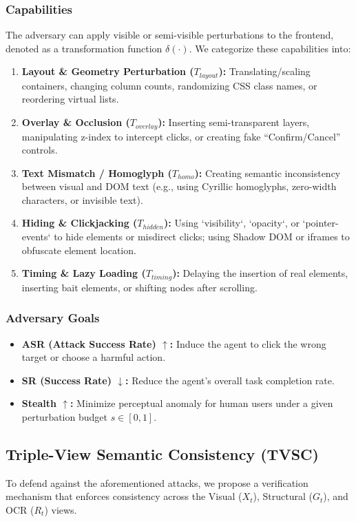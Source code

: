 \documentclass[runningheads]{llncs}
\begin{document}
\subsubsection{Capabilities}
The adversary can apply visible or semi-visible perturbations to the frontend, denoted as a transformation function $\delta(\cdot)$. We categorize these capabilities into:
\begin{enumerate}
    \item \textbf{Layout \& Geometry Perturbation ($T_{layout}$):} Translating/scaling containers, changing column counts, randomizing CSS class names, or reordering virtual lists.
    \item \textbf{Overlay \& Occlusion ($T_{overlay}$):} Inserting semi-transparent layers, manipulating z-index to intercept clicks, or creating fake ``Confirm/Cancel'' controls.
    \item \textbf{Text Mismatch / Homoglyph ($T_{homo}$):} Creating semantic inconsistency between visual and DOM text (e.g., using Cyrillic homoglyphs, zero-width characters, or invisible text).
    \item \textbf{Hiding \& Clickjacking ($T_{hidden}$):} Using `visibility`, `opacity`, or `pointer-events` to hide elements or misdirect clicks; using Shadow DOM or iframes to obfuscate element location.
    \item \textbf{Timing \& Lazy Loading ($T_{timing}$):} Delaying the insertion of real elements, inserting bait elements, or shifting nodes after scrolling.
\end{enumerate}

\subsubsection{Adversary Goals}
\begin{itemize}
    \item \textbf{ASR (Attack Success Rate) $\uparrow$:} Induce the agent to click the wrong target or choose a harmful action.
    \item \textbf{SR (Success Rate) $\downarrow$:} Reduce the agent's overall task completion rate.
    \item \textbf{Stealth $\uparrow$:} Minimize perceptual anomaly for human users under a given perturbation budget $s \in [0, 1]$.
\end{itemize}

\subsection{Triple-View Semantic Consistency (TVSC)}
To defend against the aforementioned attacks, we propose a verification mechanism that enforces consistency across the Visual ($X_t$), Structural ($G_t$), and OCR ($R_t$) views.
\end{document}
